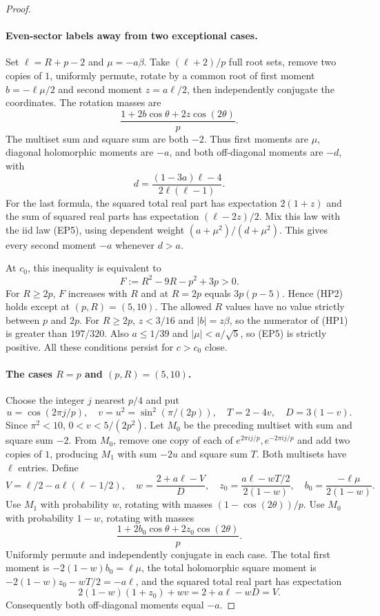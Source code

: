 \documentclass[11pt,a4paper]{article}
\theoremstyle{definition}\newtheorem{definition}[theorem]{Definition}
\theoremstyle{remark}\newtheorem{remark}[theorem]{Remark}
\begin{document}
\begin{proof}
\paragraph{Even-sector labels away from two exceptional cases.}
Set $\ell=R+p-2$ and $\mu=-a\beta$. Take $(\ell+2)/p$ full
root sets, remove two copies of $1$, uniformly permute, rotate
by a common root of first moment $b=-\ell\mu/2$ and second
moment $z=a\ell/2$, then independently conjugate the coordinates.
The rotation masses are
\[
 \frac{1+2b\cos\theta+2z\cos(2\theta)}p.
\tag{HP1}
\]
The multiset sum and square sum are both $-2$. Thus first moments
are $\mu$, diagonal holomorphic moments are $-a$, and both
off-diagonal moments are $-d$, with
\[
 d=\frac{(1-3a)\ell-4}{2\ell(\ell-1)}.
\]
For the last formula, the squared total real part has expectation
$2(1+z)$ and the sum of squared real parts has expectation
$(\ell-2z)/2$. Mix this law with the iid law (EP5), using dependent
weight $(a+\mu^2)/(d+\mu^2)$. This gives every second moment
$-a$ whenever $d>a$.

At $c_0$, this inequality is equivalent to
\[
 F:=R^2-9R-p^2+3p>0.
\tag{HP2}
\]
For $R\ge2p$, $F$ increases with $R$ and at $R=2p$ equals
$3p(p-5)$. Hence (HP2) holds except at $(p,R)=(5,10)$.
The allowed $R$ values have no value strictly between $p$ and
$2p$. For $R\ge2p$, $z<3/16$ and $|b|=z\beta$, so the numerator
of (HP1) is greater than $197/320$. Also $a\le1/39$ and
$|\mu|<a/\sqrt5$, so (EP5) is strictly positive. All these
conditions persist for $c>c_0$ close.

\paragraph{The cases $R=p$ and $(p,R)=(5,10)$.}
Choose the integer $j$ nearest $p/4$ and put
\[
 u=\cos(2\pi j/p),\quad v=u^2=\sin^2(\pi/(2p)),\quad
 T=2-4v,\quad D=3(1-v).
\]
Since $\pi^2<10$, $0<v<5/(2p^2)$. Let $M_0$ be the preceding
multiset with sum and square sum $-2$. From $M_0$, remove one
copy of each of $e^{2\pi i j/p},e^{-2\pi i j/p}$ and add two
copies of $1$, producing $M_1$ with sum $-2u$ and square sum $T$.
Both multisets have $\ell$ entries. Define
\[
 V=\ell/2-a\ell(\ell-1/2),\quad
 w=\frac{2+a\ell-V}{D},\quad
 z_0=\frac{a\ell-wT/2}{2(1-w)},\quad
 b_0=\frac{-\ell\mu}{2(1-w)}.
\]
Use $M_1$ with probability $w$, rotating with masses
$(1-\cos(2\theta))/p$. Use $M_0$ with probability $1-w$,
rotating with masses
\[
 \frac{1+2b_0\cos\theta+2z_0\cos(2\theta)}p.
\tag{HP3}
\]
Uniformly permute and independently conjugate in each case.
The total first moment is $-2(1-w)b_0=\ell\mu$, the total
holomorphic square moment is
$-2(1-w)z_0-wT/2=-a\ell$, and the squared total real part has
expectation
\[
 2(1-w)(1+z_0)+wv=2+a\ell-wD=V.
\]
Consequently both off-diagonal moments equal $-a$.


\end{proof}
\end{document}
